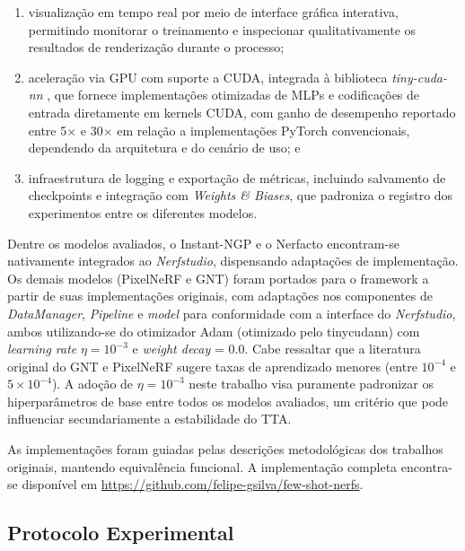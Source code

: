 \documentclass[12pt]{article}
\begin{document}
\begin{enumerate}
\item visualização em tempo real por meio de interface gráfica interativa, permitindo monitorar o treinamento e inspecionar qualitativamente os resultados de renderização durante o processo;

\item aceleração via GPU com suporte a CUDA, integrada à biblioteca \textit{tiny-cuda-nn} \cite{tinycudann}, que fornece implementações otimizadas de MLPs e codificações de entrada diretamente em kernels CUDA, com ganho de desempenho reportado entre 5$\times$ e 30$\times$ em relação a implementações PyTorch convencionais, dependendo da arquitetura e do cenário de uso; e

\item infraestrutura de logging e exportação de métricas, incluindo salvamento de checkpoints e integração com \textit{Weights \& Biases}, que padroniza o registro dos experimentos entre os diferentes modelos.
\end{enumerate}

Dentre os modelos avaliados, o Instant-NGP e o Nerfacto encontram-se nativamente integrados ao \textit{Nerfstudio}, dispensando adaptações de implementação. Os demais modelos (PixelNeRF e GNT) foram portados para o framework a partir de suas implementações originais, com adaptações nos componentes de \textit{DataManager}, \textit{Pipeline} e \textit{model} para conformidade com a interface do \textit{Nerfstudio}, ambos utilizando-se do otimizador Adam (otimizado pelo tinycudann) com \textit{learning rate} $\eta = 10^{-3}$ e \textit{weight decay} = 0.0. Cabe ressaltar que a literatura original do GNT e PixelNeRF sugere taxas de aprendizado menores (entre $10^{-4}$ e $5 \times 10^{-4}$). A adoção de $\eta = 10^{-3}$ neste trabalho visa puramente padronizar os hiperparâmetros de base entre todos os modelos avaliados, um critério que pode influenciar secundariamente a estabilidade do TTA.

As implementações foram guiadas pelas descrições metodológicas dos trabalhos originais, mantendo equivalência funcional. A implementação completa encontra-se disponível em \url{https://github.com/felipe-gsilva/few-shot-nerfs}.

\subsection{Protocolo Experimental}
\label{sec:stdin}
\end{document}
